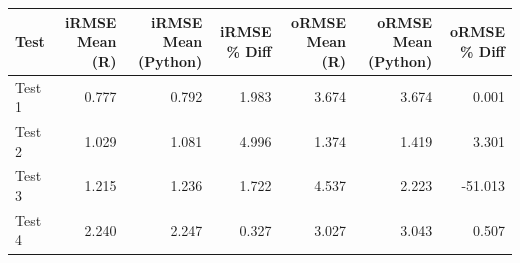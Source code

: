 
\begin{tabular}{l|r|r|r|r|r|r}
\hline
Test & iRMSE Mean (R) & iRMSE Mean (Python) & iRMSE \% Diff & oRMSE Mean (R) & oRMSE Mean (Python) & oRMSE \% Diff\\
\hline
Test 1 & 0.777 & 0.792 & 1.983 & 3.674 & 3.674 & 0.001\\
\hline
Test 2 & 1.029 & 1.081 & 4.996 & 1.374 & 1.419 & 3.301\\
\hline
Test 3 & 1.215 & 1.236 & 1.722 & 4.537 & 2.223 & -51.013\\
\hline
Test 4 & 2.240 & 2.247 & 0.327 & 3.027 & 3.043 & 0.507\\
\hline
\end{tabular}

